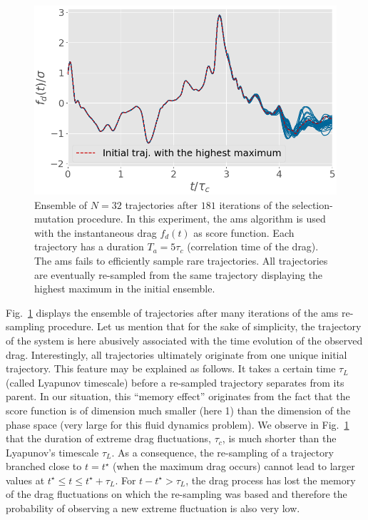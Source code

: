 \documentclass[pre,aps,floatfix,10pt,superscriptaddress, notitlepage,preprint]{revtex4-1}
\begin{document}
\begin{figure}
  \centering
  \includegraphics[width=.7\linewidth]{AMS_drag_trajectories/AMS_drag_trajectories.png}
  \caption{\label{fig:AMS_drag_trajectories} Ensemble of $N = 32$ trajectories after $181$ iterations of the selection-mutation procedure. In this experiment, the \ac{ams} algorithm is used with the instantaneous drag $f_d(t)$ as score function. Each trajectory has a duration $T_a = 5\tau_c$ (correlation time of the drag).
  The \ac{ams} fails to efficiently sample rare trajectories. All trajectories are eventually re-sampled from the same trajectory displaying the highest maximum in the initial ensemble.}
\end{figure}

%
Fig.~\ref{fig:AMS_drag_trajectories} displays the ensemble of trajectories after many iterations of the \ac{ams} re-sampling procedure. 
%
Let us mention that for the sake of simplicity, the trajectory of the system is here abusively associated with the time evolution of the observed drag.  
%
Interestingly, all trajectories ultimately originate from one unique initial trajectory. 
%
This feature may be explained as follows.
It takes a certain time $\tau_L$ (called Lyapunov timescale) before a re-sampled trajectory separates from its parent. In our situation, this ``memory effect'' originates from the fact that the score function is of dimension much smaller (here 1) than the dimension of the phase space (very large for this fluid dynamics problem). 
%
We observe in Fig.~\ref{fig:AMS_drag_trajectories} that the duration of extreme drag fluctuations, $\tau_c$, is much shorter than the Lyapunov's timescale $\tau_L$.
As a consequence, the re-sampling of a trajectory branched close to $t=t^{\star}$ (when the maximum drag occurs) cannot lead to larger values at $t^{\star} \leq t \leq t^{\star}+\tau_L$.
For $t - t^{\star} >\tau_L$, the drag process has lost the memory of the drag fluctuations on which the re-sampling was based and therefore the probability of observing a new extreme fluctuation is also very low.
%
\end{document}
